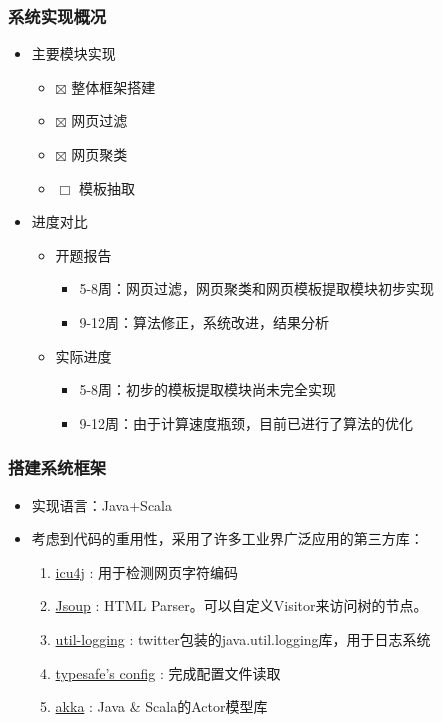 \documentclass[11pt,presentation]{beamer}
\begin{document}
\begin{frame}
\frametitle{系统实现概况}
\label{sec-2-2}
\begin{itemize}

\item 主要模块实现
\label{sec-2-2-1}%
\begin{itemize}
\item $\boxtimes$ 整体框架搭建
\item $\boxtimes$ 网页过滤
\item $\boxtimes$ 网页聚类
\item $\Box$ 模板抽取
\end{itemize}

\item 进度对比
\label{sec-2-2-2}%
\begin{itemize}

\item 开题报告
\label{sec-2-2-2-1}%
\begin{itemize}
\item 5-8周：网页过滤，网页聚类和网页模板提取模块初步实现
\item 9-12周：算法修正，系统改进，结果分析
\end{itemize}

\item 实际进度
\label{sec-2-2-2-2}%
\begin{itemize}
\item 5-8周：初步的模板提取模块尚未完全实现
\item 9-12周：由于计算速度瓶颈，目前已进行了算法的优化
\end{itemize}


\end{itemize} %
\end{itemize} %
\end{frame}
\begin{frame}
\frametitle{搭建系统框架}
\label{sec-2-3}

\begin{itemize}
\item 实现语言：Java+Scala
\item 考虑到代码的重用性，采用了许多工业界广泛应用的第三方库：
\begin{enumerate}
\item \href{http://site.icu-project.org/}{icu4j} : 用于检测网页字符编码
\item \href{http://jsoup.org}{Jsoup} : HTML Parser。可以自定义Visitor来访问树的节点。
\item \href{https://github.com/twitter/util}{util-logging} : twitter包装的java.util.logging库，用于日志系统
\item \href{https://github.com/typesafehub/config}{typesafe's config} : 完成配置文件读取
\item \href{http://akka.io}{akka} : Java \& Scala的Actor模型库
\end{enumerate}
\end{itemize}
\end{frame}
\end{document}
